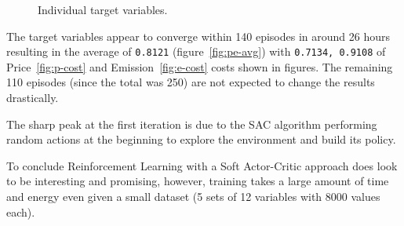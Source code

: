 \documentclass{article}
\numberwithin{equation}{subsection}
\begin{document}
	\begin{figure}[H]
		\centering	
		\caption{Individual target variables.}
	\end{figure}
	
The target variables appear to converge within 140 episodes in around 26 hours resulting in the average of \verb!0.8121! (figure~\ref{fig:pe-avg}) with \verb!0.7134, 0.9108! of Price~\ref{fig:p-cost} and Emission~\ref{fig:e-cost} costs shown in figures. The remaining 110 episodes (since the total was 250) are not expected to change the results drastically. 

The sharp peak at the first iteration is due to the SAC algorithm performing random actions at the beginning to explore the environment and build its policy. 

To conclude Reinforcement Learning with a Soft Actor-Critic approach does look to be interesting and promising, however, training takes a large amount of time and energy even given a small dataset (5 sets of 12 variables with 8000 values each). 


		



			 	
	 	
	 	


 
\end{document}
